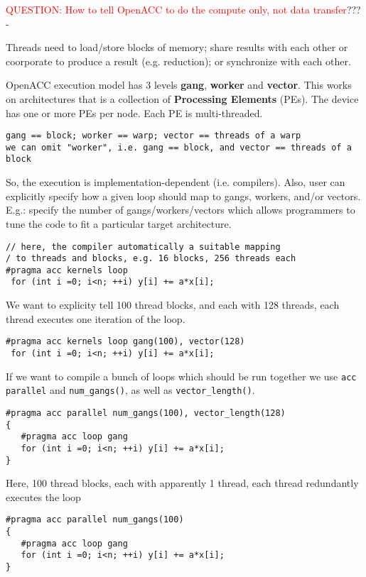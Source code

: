 \textcolor{red}{QUESTION: How to tell OpenACC to do the compute only, not data
transfer}??? - 


Threads need to load/store blocks of memory; share results with each other or
coorporate to produce a result (e.g. reduction); or synchronize with each other. 

OpenACC execution model has 3 levels {\bf gang}, {\bf worker} and {\bf vector}.
This works on architectures that is a collection of {\bf Processing Elements}
(PEs). The device has one or more PEs per node. Each PE is multi-threaded.
\begin{verbatim}
gang == block; worker == warp; vector == threads of a warp
we can omit "worker", i.e. gang == block, and vector == threads of a block
\end{verbatim} 

So, the execution is implementation-dependent (i.e. compilers). Also, user can
explicitly specify how a given loop should map to gangs, workers, and/or
vectors. E.g.: specify the number of gangs/workers/vectors which allows
programmers to tune the code to fit a particular target architecture.

\begin{verbatim}
// here, the compiler automatically a suitable mapping
/ to threads and blocks, e.g. 16 blocks, 256 threads each
#pragma acc kernels loop
 for (int i =0; i<n; ++i) y[i] += a*x[i];
\end{verbatim}
We want to explicity tell 100 thread blocks, and each with 128 threads, each
thread executes one iteration of the loop.
\begin{verbatim}
#pragma acc kernels loop gang(100), vector(128)
 for (int i =0; i<n; ++i) y[i] += a*x[i];
\end{verbatim}

If we want to compile a bunch of loops which should be run together we use
\verb!acc parallel! and \verb!num_gangs()!, as well as \verb!vector_length()!.
\begin{verbatim}
#pragma acc parallel num_gangs(100), vector_length(128)
{
   #pragma acc loop gang
   for (int i =0; i<n; ++i) y[i] += a*x[i];
}
\end{verbatim}
Here, 100 thread blocks, each with apparently 1 thread, each thread redundantly
executes the loop
\begin{verbatim}
#pragma acc parallel num_gangs(100)
{
   #pragma acc loop gang
   for (int i =0; i<n; ++i) y[i] += a*x[i];
}

\end{verbatim}


